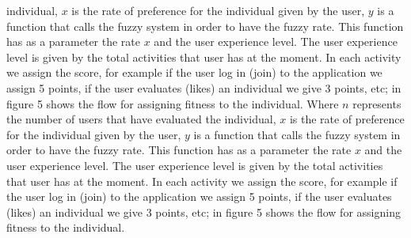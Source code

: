 individual, $x$ is the rate of preference for the  individual  given by the user,
$y$ is a function that calls the fuzzy system in order to have the fuzzy rate.
This function has as a parameter the rate $x$ and the user experience level.
The user experience level
is given  by the  total activities that user has at the moment. In each
activity we assign the score, for example if the user log in (join) to the
application we assign 5 points, if the user evaluates (likes) an individual we
give 3 points, etc; in figure 5 shows the flow for assigning fitness to
the individual. Where $n$ represents  the number of  users that have evaluated the
individual, $x$ is the rate of preference for the  individual  given by the user,
$y$ is a function that calls the fuzzy system in order to have the fuzzy rate.
This function has as a parameter the rate $x$ and the user experience level.
The user experience level
is given  by the  total activities that user has at the moment. In each
activity we assign the score, for example if the user log in (join) to the
application we assign 5 points, if the user evaluates (likes) an individual we
give 3 points, etc; in figure 5 shows the flow for assigning fitness to
the individual. 
